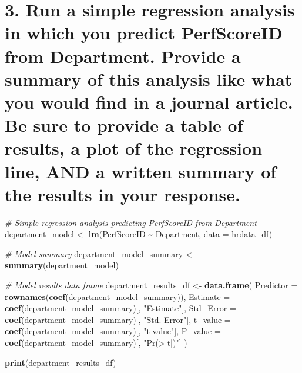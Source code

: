 \documentclass[
]{article}
\newenvironment{Shaded}{\begin{snugshade}}{\end{snugshade}}
\newcommand{\AttributeTok}[1]{\textcolor[rgb]{0.13,0.29,0.53}{#1}}
\newcommand{\CommentTok}[1]{\textcolor[rgb]{0.56,0.35,0.01}{\textit{#1}}}
\newcommand{\FunctionTok}[1]{\textcolor[rgb]{0.13,0.29,0.53}{\textbf{#1}}}
\newcommand{\NormalTok}[1]{#1}
\newcommand{\OtherTok}[1]{\textcolor[rgb]{0.56,0.35,0.01}{#1}}
\newcommand{\SpecialCharTok}[1]{\textcolor[rgb]{0.81,0.36,0.00}{\textbf{#1}}}
\newcommand{\StringTok}[1]{\textcolor[rgb]{0.31,0.60,0.02}{#1}}
\begin{document}
\section{3. Run a simple regression analysis in which you predict
PerfScoreID from Department. Provide a summary of this analysis like
what you would find in a journal article. Be sure to provide a table of
results, a plot of the regression line, AND a written summary of the
results in your
response.}\label{run-a-simple-regression-analysis-in-which-you-predict-perfscoreid-from-department.-provide-a-summary-of-this-analysis-like-what-you-would-find-in-a-journal-article.-be-sure-to-provide-a-table-of-results-a-plot-of-the-regression-line-and-a-written-summary-of-the-results-in-your-response.}

\begin{Shaded}
\begin{Highlighting}[]
\CommentTok{\# Simple regression analysis predicting PerfScoreID from Department}
\NormalTok{department\_model }\OtherTok{\textless{}{-}} \FunctionTok{lm}\NormalTok{(PerfScoreID }\SpecialCharTok{\textasciitilde{}}\NormalTok{ Department, }\AttributeTok{data =}\NormalTok{ hrdata\_df)}

\CommentTok{\# Model summary}
\NormalTok{department\_model\_summary }\OtherTok{\textless{}{-}} \FunctionTok{summary}\NormalTok{(department\_model)}

\CommentTok{\# Model results data frame}
\NormalTok{department\_results\_df }\OtherTok{\textless{}{-}} \FunctionTok{data.frame}\NormalTok{(}
  \AttributeTok{Predictor =} \FunctionTok{rownames}\NormalTok{(}\FunctionTok{coef}\NormalTok{(department\_model\_summary)),}
  \AttributeTok{Estimate =} \FunctionTok{coef}\NormalTok{(department\_model\_summary)[, }\StringTok{"Estimate"}\NormalTok{],}
  \AttributeTok{Std\_Error =} \FunctionTok{coef}\NormalTok{(department\_model\_summary)[, }\StringTok{"Std. Error"}\NormalTok{],}
  \AttributeTok{t\_value =} \FunctionTok{coef}\NormalTok{(department\_model\_summary)[, }\StringTok{"t value"}\NormalTok{],}
  \AttributeTok{P\_value =} \FunctionTok{coef}\NormalTok{(department\_model\_summary)[, }\StringTok{"Pr(\textgreater{}|t|)"}\NormalTok{]}
\NormalTok{)}

\FunctionTok{print}\NormalTok{(department\_results\_df)}
\end{Highlighting}
\end{Shaded}
\end{document}
